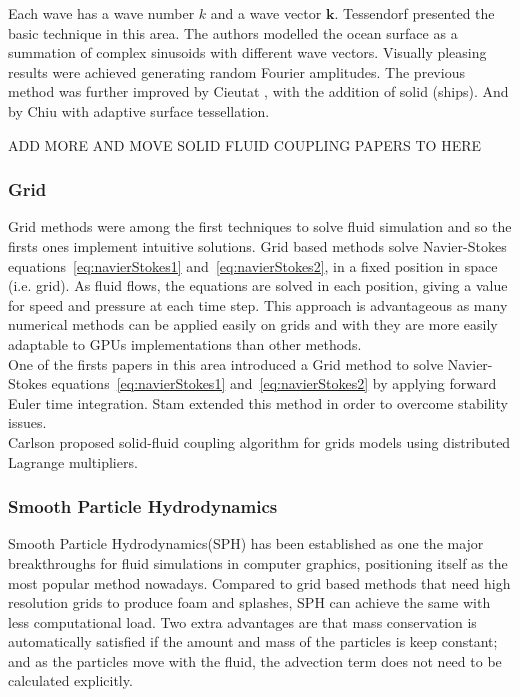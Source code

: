 Each wave has a wave number $k$ and a wave vector $\mathbf{k}$.
Tessendorf \cite{Tessendorf2001} presented the basic technique in this area.
The authors modelled the ocean surface as a summation of complex sinusoids with different wave vectors.
Visually pleasing results were achieved generating random Fourier amplitudes.
The previous method was further improved by Cieutat \cite{Cieutat2003}, with the addition of solid (ships).
And by Chiu \cite{Chiu2006} with adaptive surface tessellation.


ADD MORE AND MOVE SOLID FLUID COUPLING PAPERS TO HERE

\subsubsection{Grid}

Grid methods were among the first techniques to solve fluid simulation and so the firsts ones implement intuitive solutions.
Grid based methods solve Navier-Stokes equations~\ref{eq:navierStokes1} and~\ref{eq:navierStokes2}, in a fixed position in space (i.e. grid).
As fluid flows, the equations are solved in each position, giving a value for speed and pressure at each time step.
This approach is advantageous as many numerical methods can be applied easily on grids and with they are more easily adaptable to GPUs implementations than other methods.\\

One of the firsts papers in this area introduced a Grid method \cite{Foster1996} to solve Navier-Stokes equations~\ref{eq:navierStokes1} and~\ref{eq:navierStokes2} by applying forward Euler time integration. 
Stam \cite{Stam1999} extended this method in order to overcome stability issues.\\

Carlson \cite{Carlson2004} proposed solid-fluid coupling algorithm for grids models using distributed Lagrange multipliers.

\subsubsection{Smooth Particle Hydrodynamics}

Smooth Particle Hydrodynamics(SPH) has been established as one the major breakthroughs for fluid simulations in computer graphics, positioning itself as the most popular method nowadays.
Compared to grid based methods that need high resolution grids to produce foam and splashes, SPH can achieve the same with less computational load.
Two extra advantages are that mass conservation is automatically satisfied if the amount and mass of the particles is keep constant;
and as the particles move with the fluid, the advection term does not need to be calculated explicitly.\\


